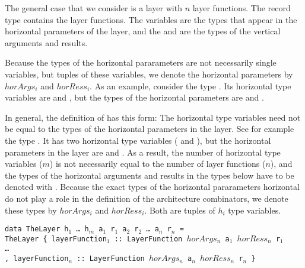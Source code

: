 \documentclass[preprint,natbib]{sigplanconf}
\begin{document}


The general case that we consider is a layer with $n$ layer functions. The record type  contains the layer functions. The  variables are the types that appear in the horizontal parameters of the layer, and the  and  are the types of the vertical arguments and results. 

Because the types of the horizontal pararameters are not necessarily single  variables, but tuples of these variables, we denote the horizontal parameters by $horArgs_i$ and $horRess_i$. As an example, consider the type . Its horizontal  type variables are  and , but the types of the horizontal parameters are  and . 

In general, the definition of  has this form:
\bc
The horizontal type variables need not be equal to the types of the horizontal parameters in the layer. See for example the type . It has two horizontal type variables ( and ), but the horizontal parameters in the layer are  and . As a result, the number of horizontal type variables ($m$) is not necessarily equal to the number of layer functions ($n$), and the types of the horizontal arguments and results in the  types below have to be denoted with \p{(\dots)}. Because the exact types of the horizontal pararameters horizontal do not play a role in the definition of the architecture combinators, we denote these types by $horArgs_i$ and $horRess_i$. Both are tuples of $h_i$ type variables.  
\ec

\begin{small}
\begin{tabbing}
{\tt data Th}\={\tt eLayer h$_1$ \dots ~h$_m$ a$_1$ r$_1$ a$_2$ r$_2$ \dots ~a$_n$ r$_n$ = }\\
\> {\tt TheLayer~}\={\tt \{~layerFunction$_1$}\verb| :: |{\tt LayerFunction $horArgs_n$ a$_1$ $horRess_n$ r$_1$}\\
\>\> {\tt \dots }\\
\>\> {\tt , layerFunction$_n$}\verb| :: |{\tt LayerFunction $horArgs_n$ a$_n$ $horRess_n$ r$_n$ \}}\\
\end{tabbing}
\end{small}
\end{document}
